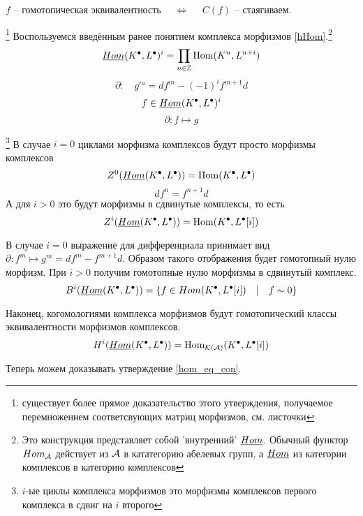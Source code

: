 \documentclass[../main.tex]{subfiles}
\begin{document}
\begin{to_suj}
\label{hom_eq_con}
 $f$ -- гомотопическая эквивалентность $\quad \Leftrightarrow \quad$ $C(f)$ -- стаягиваем.
\end{to_suj}\footnote{существует более прямое доказательство этого утверждения, получаемое перемножением соответсвующих матриц морфизмов, см. листочки}
    Воспользуемся введённым ранее понятием комплекса морфизмов \ref{hHom}.\footnote{Это конструкция представляет собой 'внутренний' $\underline{Hom}$. Обычный функтор $Hom_{\mathcal{A}}$ действует из $\mathcal{A}$ в кататегорию абелевых групп, а $\underline{Hom}$ из категории комплексов в категорию комплексов} 
    \[\underline{Hom} (K^\bullet, L^\bullet)^{i} = \prod_{n\in \mathbb{Z}}\operatorname{Hom}(K^n, L^{n+i})\]
    \[\partial\colon \quad g^m = df^m - (-1)^if^{m+1}d\]
    \[f\in \underline{Hom}(K^\bullet, L^\bullet)^i\]
    \[\partial\colon f \mapsto g\]
\begin{to_com}\footnote{$i$-ые циклы комплекса морфизмов это морфизмы комплексов первого комплекса в сдвиг на $i$ второго}
    В случае $i=0$ циклами морфизма комплексов будут просто морфизмы комплексов 
    \[
        Z^0 (\underline{Hom}(K^\bullet, L^\bullet)) = \operatorname{Hom}(K^\bullet, L^\bullet)
    \]
    \[
    df^n = f^{n+1}d
    \]
    А для $i>0$ это будут морфизмы в сдвинутые комплексы, то есть 
    \[
    Z^i (\underline{Hom}(K^\bullet, L^\bullet)) = \operatorname{Hom}(K^\bullet, L^\bullet[i])
    \]
\end{to_com}
\begin{to_com}
    В случае $i=0$ выражение для дифференциала принимает вид $\partial\colon f^m\mapsto g^m = df^m - f^{m+1}d$. Образом такого отображения будет гомотопный нулю морфизм. При $i>0$ получим гомотопные нулю морфизмы в сдвинутый комплекс.
    \[
        B^i (\underline{Hom}(K^\bullet, L^\bullet)) = \lbrace f\in Hom(K^\bullet, L^\bullet[i])\quad|\quad f\sim 0 \rbrace
    \]
\end{to_com}
\begin{to_com}\label{cohomology_comp_mor}
Наконец, когомологиями комплекса морфизмов будут гомотопический классы эквивалентности морфизмов комплексов.
\[
H^i (\underline{Hom}(K^\bullet, L^\bullet)) = \operatorname{Hom}_{\mathcal{K(A)}}(K^\bullet, L^\bullet[i])
\]
\end{to_com}
Теперь можем доказывать утверждение \ref{hom_eq_con}.
\end{document}
